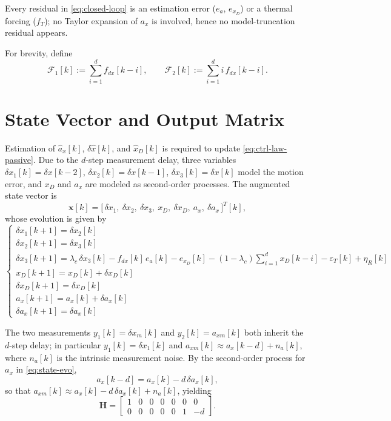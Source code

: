 \documentclass[11pt,a4paper]{ctexart}
\newcommand{\lc}{\lambda_c}
\newcommand{\fdx}{f_{dx}}
\newcommand{\fT}{f_T}
\newcommand{\dx}{\delta x}
\newcommand{\dxm}{\delta x_m}
\newcommand{\axm}{a_{xm}}
\newcommand{\dxone}{\delta x_1}
\newcommand{\dxtwo}{\delta x_2}
\newcommand{\dxthree}{\delta x_3}
\newcommand{\xD}{x_D}
\newcommand{\dxD}{\delta x_D}
\newcommand{\ax}{a_x}
\newcommand{\dax}{\delta a_x}
\newcommand{\axhat}{\hat a_x}
\newcommand{\xDhat}{\hat x_D}
\newcommand{\dxhat}{\delta\hat x}
\newcommand{\HH}{\mathbf{H}}
\newcommand{\xx}{\mathbf{x}}
\newcommand{\ea}{e_{a}}
\newcommand{\exD}{e_{x_D}}
\newcommand{\epsT}{\varepsilon_T}
\newcommand{\etaR}{\eta_{R}}
\begin{document}
Every residual in \eqref{eq:closed-loop} is an estimation error ($\ea$, $\exD$) or a thermal forcing ($\fT$); no Taylor expansion of $\ax$ is involved, hence no model-truncation residual appears.

For brevity, define
\begin{equation}
\mathcal{F}_1[k] := \sum_{i=1}^{d}\!\fdx[k{-}i], \qquad
\mathcal{F}_2[k] := \sum_{i=1}^{d}\!i\,\fdx[k{-}i].
\label{eq:F12}
\end{equation}

\section{State Vector and Output Matrix}

Estimation of $\axhat[k]$, $\dxhat[k]$, and $\xDhat[k]$ is required to update \eqref{eq:ctrl-law-passive}. Due to the $d$-step measurement delay, three variables $\dxone[k] = \dx[k{-}2]$, $\dxtwo[k] = \dx[k{-}1]$, $\dxthree[k] = \dx[k]$ model the motion error, and $\xD$ and $\ax$ are modeled as second-order processes. The augmented state vector is
\begin{equation}
\xx[k] = \bigl[\,\dxone,\ \dxtwo,\ \dxthree,\ \xD,\ \dxD,\ \ax,\ \dax\,\bigr]^T[k],
\label{eq:state-vec}
\end{equation}
whose evolution is given by
\begin{equation}
\begin{cases}
\dxone[k{+}1]   = \dxtwo[k] \\[2pt]
\dxtwo[k{+}1]   = \dxthree[k] \\[2pt]
\dxthree[k{+}1] = \lc\,\dxthree[k] - \fdx[k]\,\ea[k] - \exD[k] - (1{-}\lc)\!\sum_{i=1}^{d}\xD[k{-}i] - \epsT[k] + \etaR[k] \\[2pt]
\xD[k{+}1]      = \xD[k] + \dxD[k] \\[2pt]
\dxD[k{+}1]     = \dxD[k] \\[2pt]
\ax[k{+}1]      = \ax[k] + \dax[k] \\[2pt]
\dax[k{+}1]     = \dax[k]
\end{cases}
\label{eq:state-evo}
\end{equation}

The two measurements $y_1[k] = \dxm[k]$ and $y_2[k] = \axm[k]$ both inherit the $d$-step delay; in particular $y_1[k] = \dxone[k]$ and $\axm[k] \approx \ax[k{-}d] + n_a[k]$, where $n_a[k]$ is the intrinsic measurement noise. By the second-order process for $\ax$ in \eqref{eq:state-evo},
\begin{equation}
\ax[k{-}d] = \ax[k] - d\,\dax[k],
\label{eq:ax-back}
\end{equation}
so that $\axm[k] \approx \ax[k] - d\,\dax[k] + n_a[k]$, yielding
\begin{equation}
\HH = \begin{bmatrix}
1 & 0 & 0 & 0 & 0 & 0 & 0 \\
0 & 0 & 0 & 0 & 0 & 1 & -d
\end{bmatrix}.
\label{eq:H}
\end{equation}
\end{document}

